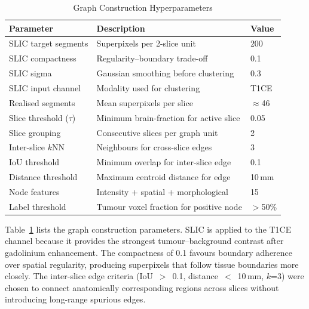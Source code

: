 \documentclass{article}
\begin{document}
\begin{table}[htbp]
\caption{Graph Construction Hyperparameters}
\label{tab:graphparams}
\begin{center}
\begin{tabularx}{0.85\textwidth}{|l|X|l|}
\hline
\textbf{Parameter} & \textbf{Description} & \textbf{Value} \\
\hline
SLIC target segments & Superpixels per 2-slice unit & 200 \\
\hline
SLIC compactness & Regularity--boundary trade-off & 0.1 \\
\hline
SLIC sigma & Gaussian smoothing before clustering & 0.3 \\
\hline
SLIC input channel & Modality used for clustering & T1CE \\
\hline
Realised segments & Mean superpixels per slice & $\approx$46 \\
\hline
Slice threshold ($\tau$) & Minimum brain-fraction for active slice & 0.05 \\
\hline
Slice grouping & Consecutive slices per graph unit & 2 \\
\hline
Inter-slice $k$NN & Neighbours for cross-slice edges & 3 \\
\hline
IoU threshold & Minimum overlap for inter-slice edge & 0.1 \\
\hline
Distance threshold & Maximum centroid distance for edge & 10\,mm \\
\hline
Node features & Intensity + spatial + morphological & 15 \\
\hline
Label threshold & Tumour voxel fraction for positive node & $>$50\% \\
\hline
\end{tabularx}
\end{center}
\end{table}

Table~\ref{tab:graphparams} lists the graph construction parameters. SLIC is
applied to the T1CE channel because it provides the strongest tumour--background
contrast after gadolinium enhancement. The compactness of 0.1 favours boundary
adherence over spatial regularity, producing superpixels that follow tissue
boundaries more closely. The inter-slice edge criteria (IoU~$>$~0.1,
distance~$<$~10\,mm, $k$=3) were chosen to connect anatomically corresponding
regions across slices without introducing long-range spurious edges.
\end{document}
